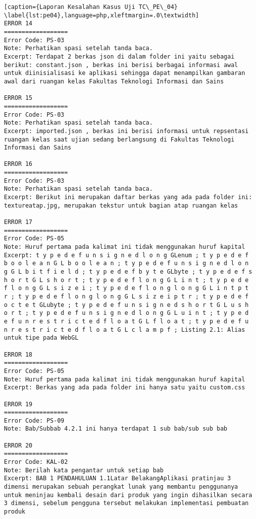 \begin{enumerate}
\begin{lstlisting}[caption={Laporan Kesalahan Kasus Uji TC\_PE\_04}	\label{lst:pe04},language=php,xleftmargin=.0\textwidth]
ERROR 14
==================
Error Code: PS-03
Note: Perhatikan spasi setelah tanda baca.
Excerpt: Terdapat 2 berkas json di dalam folder ini yaitu sebagai berikut: constant.json , berkas ini berisi berbagai informasi awal untuk diinisialisasi ke aplikasi sehingga dapat menampilkan gambaran awal dari ruangan kelas Fakultas Teknologi Informasi dan Sains

ERROR 15
==================
Error Code: PS-03
Note: Perhatikan spasi setelah tanda baca.
Excerpt: imported.json , berkas ini berisi informasi untuk repsentasi ruangan kelas saat ujian sedang berlangsung di Fakultas Teknologi Informasi dan Sains

ERROR 16
==================
Error Code: PS-03
Note: Perhatikan spasi setelah tanda baca.
Excerpt: Berikut ini merupakan daftar berkas yang ada pada folder ini: textureatap.jpg, merupakan tekstur untuk bagian atap ruangan kelas

ERROR 17
==================
Error Code: PS-05
Note: Huruf pertama pada kalimat ini tidak menggunakan huruf kapital
Excerpt: t y p e d e f u n s i g n e d l o n g GLenum ; t y p e d e f b o o l e a n G L b o o l e a n ; t y p e d e f u n s i g n e d l o n g G L b i t f i e l d ; t y p e d e f b y t e GLbyte ; t y p e d e f s h o r t G L s h o r t ; t y p e d e f l o n g G L i n t ; t y p e d e f l o n g G L s i z e i ; t y p e d e f l o n g l o n g G L i n t p t r ; t y p e d e f l o n g l o n g G L s i z e i p t r ; t y p e d e f o c t e t GLubyte ; t y p e d e f u n s i g n e d s h o r t G L u s h o r t ; t y p e d e f u n s i g n e d l o n g G L u i n t ; t y p e d e f u n r e s t r i c t e d f l o a t G L f l o a t ; t y p e d e f u n r e s t r i c t e d f l o a t G L c l a m p f ; Listing 2.1: Alias untuk tipe pada WebGL

ERROR 18
==================
Error Code: PS-05
Note: Huruf pertama pada kalimat ini tidak menggunakan huruf kapital
Excerpt: Berkas yang ada pada folder ini hanya satu yaitu custom.css

ERROR 19
==================
Error Code: PS-09
Note: Bab/Subbab 4.2.1 ini hanya terdapat 1 sub bab/sub sub bab

ERROR 20
==================
Error Code: KAL-02
Note: Berilah kata pengantar untuk setiap bab
Excerpt: BAB 1 PENDAHULUAN 1.1Latar BelakangAplikasi pratinjau 3 dimensi merupakan sebuah perangkat lunak yang membantu penggunanya untuk meninjau kembali desain dari produk yang ingin dihasilkan secara 3 dimensi, sebelum pengguna tersebut melakukan implementasi pembuatan produk


\end{lstlisting}
\end{enumerate}
